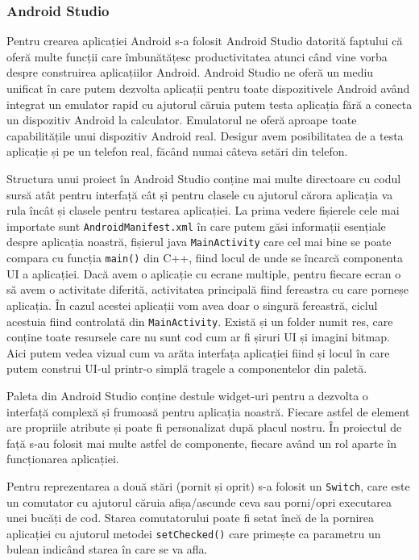 \documentclass[../IoMusT.tex]{subfiles}
\begin{document}
\subsubsection{Android Studio}
Pentru crearea aplicației Android s-a folosit Android Studio datorită faptului că oferă multe funcții care îmbunătățesc productivitatea atunci când vine vorba despre construirea  aplicațiilor Android. Android Studio ne oferă un mediu unificat în care putem dezvolta aplicații pentru toate dispozitivele Android având integrat un emulator rapid cu ajutorul căruia putem testa aplicația fără a conecta un dispozitiv Android la calculator. Emulatorul ne oferă aproape toate capabilitățile unui dispozitiv Android real. Desigur avem posibilitatea de a testa aplicație și pe un telefon real, făcând numai câteva setări din telefon.
\\
\par Structura unui proiect în Android Studio conține mai multe directoare cu codul sursă atât pentru interfață cât și pentru clasele cu ajutorul cărora aplicația va rula încât și clasele pentru testarea aplicației. La prima vedere fișierele cele mai importate sunt \verb|AndroidManifest.xml| în care putem găsi informații esențiale despre aplicația noastră, fișierul java \verb|MainActivity| care cel mai bine se poate compara cu funcția \verb|main()| din C++, fiind locul de unde se încarcă componenta UI a aplicației. Dacă avem o aplicație cu ecrane multiple, pentru fiecare ecran o să avem o activitate diferită, activitatea principală fiind fereastra cu care porneșe aplicația. În cazul acestei aplicații vom avea doar o singură fereastră, ciclul acestuia fiind controlată din \verb|MainActivity|. Există și un folder numit res, care conține toate resursele care nu sunt cod cum ar fi șiruri UI și imagini bitmap. Aici putem vedea vizual cum va arăta interfața aplicației fiind și locul în care putem construi UI-ul printr-o simplă tragele a componentelor din paletă.
\\
\par Paleta din Android Studio conține destule widget-uri pentru a dezvolta o interfață complexă și frumoasă pentru aplicația noastră. Fiecare astfel de element are propriile atribute și poate fi personalizat după placul nostru. În proiectul de față s-au folosit mai multe astfel de componente, fiecare având un rol aparte în funcționarea aplicației.
\\
\par
 Pentru reprezentarea a două stări (pornit și oprit) s-a folosit un \verb|Switch|, care este un comutator cu ajutorul căruia afișa/ascunde ceva sau porni/opri executarea unei bucăți de cod. Starea comutatorului poate fi setat încă de la pornirea aplicației cu ajutorul metodei \verb|setChecked()| care primește ca parametru un bulean indicând starea în care se va afla.
\end{document}
